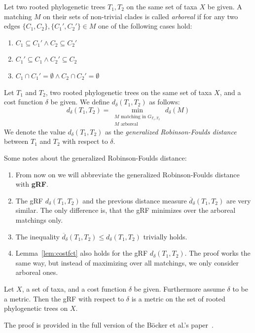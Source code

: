 \begin{defin}\label{def:arboreal}
Let two rooted phylogenetic trees $T_1, T_2$ on the same set of taxa $X$ be given. A matching $M$ on their sets of non-trivial clades is called \textit{arboreal} if for any two edges $\{C_1,C_2\}, \{C_1',C_2'\} \in M$ one of the following cases hold:
\begin{enumerate}
\item $C_1 \subseteq C_1' \wedge C_2 \subseteq C_2'$
\item $C_1' \subseteq C_1 \wedge C_2' \subseteq C_2$
\item $C_1 \cap C_1' = \emptyset \wedge C_2 \cap C_2' = \emptyset$
\end{enumerate}
\end{defin}
\begin{defin}
Let $T_1$ and $T_2$, two rooted phylogenetic trees on the same set of taxa $X$, and a cost function $\delta$ be given. We define $d_{\delta}(T_1,T_2)$ as follows:
$$d_{\delta}(T_1,T_2) = \min_{\substack{M \text{ matching in }G_{T_1,T_2} \\ M \text{ arboreal}}} \, d_{\delta}(M)$$
We denote the value $d_{\delta}(T_1,T_2)$ as the \textit{generalized Robinson-Foulds distance} between $T_1$ and $T_2$ with respect to $\delta$.
\end{defin} 
\begin{rem}
Some notes about the generalized Robinson-Foulds distance:
\begin{enumerate}
\item From now on we will abbreviate the generalized Robinson-Foulds distance with \textbf{gRF}.
\item The gRF $d_{\delta}(T_1,T_2)$ and the previous distance measure $\overline{d}_{\delta}(T_1,T_2)$ are very similar. The only difference is, that the gRF minimizes over the arboreal matchings only.
\item The inequality $\overline{d}_{\delta}(T_1,T_2) \leq d_{\delta}(T_1,T_2)$ trivially holds.
\item Lemma~\ref{lem:costfct} also holds for the gRF $d_{\delta}(T_1,T_2)$. The proof works the same way, but instead of maximizing over all matchings, we only consider arboreal ones.
\end{enumerate}
\end{rem}
\begin{lem}
Let $X$, a set of taxa, and a cost function $\delta$ be given. Furthermore assume $\delta$ to be a metric. Then the gRF with respect to $\delta$ is a metric on the set of rooted phylogenetic trees on $X$.
\end{lem}
The proof is provided in the full version of the Böcker et al.'s paper~\cite{Boe}.

